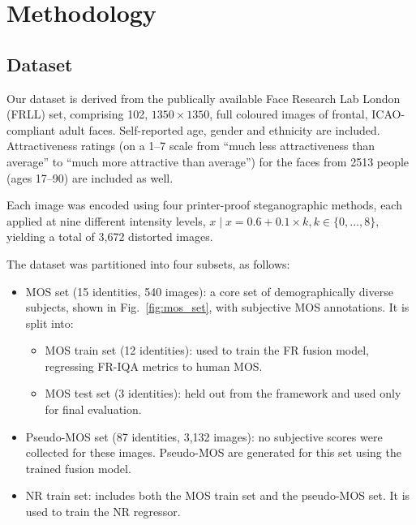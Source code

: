 \chapter{Methodology}\label{chap:methodology}

\section{Dataset}

Our dataset is derived from the publically available Face Research Lab London~\cite{frll} (FRLL) set, comprising 102, $1350 \times 1350$, full coloured images of frontal, ICAO-compliant adult faces. Self-reported age, gender and ethnicity are included. Attractiveness ratings (on a 1--7 scale from ``much less attractiveness than average'' to ``much more attractive than average'') for the faces from 2513 people (ages 17--90) are included as well.

Each image was encoded using four printer-proof steganographic methods, each applied at nine different intensity levels, $x \mid x = 0.6 + 0.1 \times k, k \in \{0, \hdots, 8\}$, yielding a total of 3,672 distorted images.

The dataset was partitioned into four subsets, as follows:

\begin{itemize}
    \item MOS set (15 identities, 540 images): a core set of demographically diverse subjects, shown in Fig.~\ref{fig:mos_set}, with subjective MOS annotations. It is split into:
    \begin{itemize}
        \item MOS train set (12 identities): used to train the FR fusion model, regressing FR-IQA metrics to human MOS.\@
        \item MOS test set (3 identities): held out from the framework and used only for final evaluation.
    \end{itemize}
    \item Pseudo-MOS set (87 identities, 3,132 images): no subjective scores were collected for these images. Pseudo-MOS are generated for this set using the trained fusion model.
    \item NR train set: includes both the MOS train set and the pseudo-MOS set. It is used to train the NR regressor.
\end{itemize}

